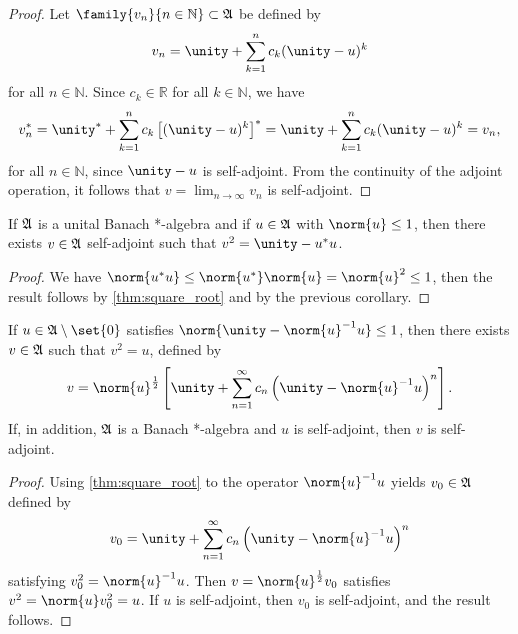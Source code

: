 \begin{proof}
    Let \(\family{v_n}{n \in \mathbb{N}} \subset \algebra{A}\) be defined by
    \begin{equation*}
        v_n = \unity + \sum_{k = 1}^n c_k (\unity - u)^k
    \end{equation*}
    for all \(n \in \mathbb{N}\). Since \(c_k \in \mathbb{R}\) for all \(k \in \mathbb{N}\), we have
    \begin{equation*}
        v_n^* = \unity^* + \sum_{k=1}^n c_k\left[(\unity - u)^k\right]^* = \unity + \sum_{k=1}^n c_k (\unity - u)^k = v_n,
    \end{equation*}
    for all \(n \in \mathbb{N}\), since \(\unity - u\) is self-adjoint. From the continuity of the adjoint operation, it follows that \(\displaystyle v = \lim_{n\to\infty} v_n\) is self-adjoint.
\end{proof}
\begin{corollary}
    If \(\mathfrak{A}\) is a unital Banach *-algebra and if \(u \in \mathfrak{A}\) with \(\norm{u} \leq 1\), then there exists \(v \in \mathfrak{A}\) self-adjoint such that \(v^2 = \unity - u^*u\).
\end{corollary}
\begin{proof}
    We have \(\norm{u^*u} \leq \norm{u^*}\norm{u} = \norm{u}^2 \leq 1\), then the result follows by \cref{thm:square_root} and by the previous corollary.
\end{proof}
\begin{corollary}
    If \(u \in \algebra{A} \setminus\set{0}\) satisfies \(\norm{\unity - \norm{u}^{-1} u} \leq 1\), then there exists \(v \in \mathfrak{A}\) such that \(v^2 = u\), defined by
    \begin{equation*}
        v = \norm{u}^{\frac12} \left[\unity + \sum_{n = 1}^\infty c_n\left(\unity - \norm{u}^{-1}u\right)^n\right].
    \end{equation*}
    If, in addition, \(\mathfrak{A}\) is a Banach *-algebra and \(u\) is self-adjoint, then \(v\) is self-adjoint.
\end{corollary}
\begin{proof}
    Using \cref{thm:square_root} to the operator \(\norm{u}^{-1}u\) yields \(v_0 \in \mathfrak{A}\) defined by
    \begin{equation*}
        v_0  = \unity + \sum_{n = 1}^\infty c_n\left(\unity - \norm{u}^{-1}u\right)^n
    \end{equation*}
    satisfying \(v_0^2 = \norm{u}^{-1} u\). Then \(v = \norm{u}^{\frac12}v_0\) satisfies \(v^2 = \norm{u} v_0^2 = u\). If \(u\) is self-adjoint, then \(v_0\) is self-adjoint, and the result follows.
\end{proof}
